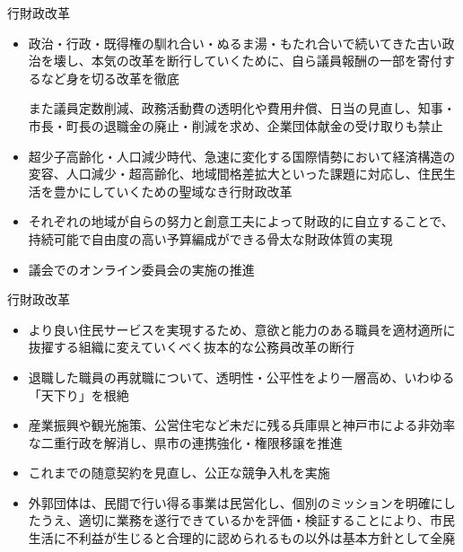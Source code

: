\documentclass[dvipdfmx]{beamer}
\begin{document}
    \begin{frame}{行財政改革}{}
        \begin{small}
            \begin{itemize}
                \setlength{\parsep}{.5mm}
                \setlength{\itemsep}{2mm}
                \item 政治・行政・既得権の馴れ合い・ぬるま湯・もたれ合いで続いてきた古い政治を壊し、本気の改革を断行していくために、自ら議員報酬の一部を寄付するなど身を切る改革を徹底\par
                また議員定数削減、政務活動費の透明化や費用弁償、日当の見直し、知事・市長・町長の退職金の廃止・削減を求め、企業団体献金の受け取りも禁止
                \item 超少子高齢化・人口減少時代、急速に変化する国際情勢において経済構造の変容、人口減少・超高齢化、地域間格差拡大といった課題に対応し、住民生活を豊かにしていくための聖域なき行財政改革
                \item それぞれの地域が自らの努力と創意工夫によって財政的に自立することで、持続可能で自由度の高い予算編成ができる骨太な財政体質の実現
                \item 議会でのオンライン委員会の実施の推進
            \end{itemize}
        \end{small}
    \end{frame}

    \begin{frame}{行財政改革}{}
        \begin{small}
            \begin{itemize}
                \setlength{\parsep}{.5mm}
                \setlength{\itemsep}{2mm}
                \item より良い住民サービスを実現するため、意欲と能力のある職員を適材適所に抜擢する組織に変えていくべく抜本的な公務員改革の断行
                \item 退職した職員の再就職について、透明性・公平性をより一層高め、いわゆる「天下り」を根絶
                \item 産業振興や観光施策、公営住宅など未だに残る兵庫県と神戸市による非効率な二重行政を解消し、県市の連携強化・権限移譲を推進
                \item これまでの随意契約を見直し、公正な競争入札を実施
                \item 外郭団体は、民間で行い得る事業は民営化し、個別のミッションを明確にしたうえ、適切に業務を遂行できているかを評価・検証することにより、市民生活に不利益が生じると合理的に認められるもの以外は基本方針として全廃
            \end{itemize}
        \end{small}
    \end{frame}
\end{document}
